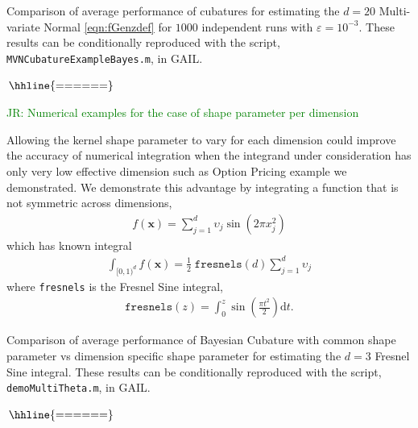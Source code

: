 \documentclass{iitthesis}          %
\newcommand{\bm}[1]{\boldsymbol{#1}}
\newcommand{\dif}[1]{\text{d}{#1}}
\newcommand{\vx}{\bm{x}}
\newcommand{\dt}{\dif{{t}}}
\newcommand{\code}[1]{\texttt{#1}}
\newcommand{\JRNote}[1]{{\textcolor{green}{JR: #1}}}
\begin{document}
{{{{{{\begin{table}[ht] %
\centering
\caption{Comparison of average performance of cubatures for estimating the $d=20$ Multi-variate Normal \eqref{eqn:fGenzdef} for $1000$ independent runs with $\varepsilon=10^{-3}$. These results can be conditionally reproduced with the script, \code{MVNCubatureExampleBayes.m}, in GAIL. 
\label{tab3}}	   
$
\arraycolsep=1.4pt\def\arraystretch{0.9}
\begin{array}{l@{\quad}r@{\quad}r@{\quad}r@{\quad}r@{\quad}r@{\quad}r}
\hhline{======}
 
\end{array}
$
\end{table}


\clearpage










\JRNote{ Numerical examples for the case of shape parameter per dimension }

Allowing the kernel shape parameter to vary for each dimension could improve the accuracy of numerical integration when the integrand under consideration has only very low effective dimension such as Option Pricing example we demonstrated. We demonstrate this advantage by integrating a function that is not symmetric across dimensions,
\begin{align}
\label{eqn:fresnels}
f(\vx) = \sum_{j=1}^d \upsilon_j \sin(2 \pi x_j^2)
\end{align} 
which has known integral
\begin{align*}
\int_{[0,1)^d} f(\vx)  = \frac{1}{2} \; \code{fresnels}(d) \sum_{j=1}^{d} \upsilon_j
\end{align*}
where \code{fresnels} is the Fresnel Sine integral,
\begin{align*}
\code{fresnels}(z) = \int_{0}^{z} \sin \left( \frac{\pi t^2}{2} \right) \dt.
\end{align*}


\begin{table}[ht] %
	\centering
	\caption{Comparison of average performance of Bayesian Cubature with common shape parameter vs dimension specific shape parameter
		 for estimating the $d=3$ Fresnel Sine integral. These results can be conditionally reproduced with the script, \code{demoMultiTheta.m}, in GAIL. 
		\label{tabMultiTheta}}	   
	$
	\arraycolsep=1.4pt\def\arraystretch{0.9}
\begin{array}{l@{\quad}r@{\quad}r@{\quad}r@{\quad}r@{\quad}r@{\quad}r}
\hhline{======}
 
\end{array}	
	$
\end{table}

}}}}}}
\end{document}
